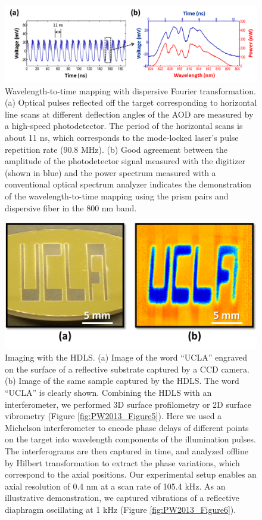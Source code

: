 \begin{figure}[htb!]
\centering
\includegraphics[scale=1]{PW2013/Figure3.png}
\caption{Wavelength-to-time mapping with dispersive Fourier transformation. (a) Optical pulses reflected off the target corresponding to horizontal line scans at different deflection angles of the AOD are measured by a high-speed photodetector. The period of the horizontal scans is about 11 ns, which corresponds to the mode-locked laser’s pulse repetition rate (90.8 MHz). (b) Good agreement between the amplitude of the photodetector signal measured with the digitizer (shown in blue) and the power spectrum measured with a conventional optical spectrum analyzer indicates the demonstration of the wavelength-to-time mapping using the prism pairs and dispersive fiber in the 800 nm band.}
\label{fig:PW2013_Figure3}
\end{figure}

\begin{figure}[htb!]
\centering
\includegraphics[scale=1]{PW2013/Figure4.png}
\caption{Imaging with the HDLS. (a) Image of the word “UCLA” engraved on the surface of a reflective substrate captured by a CCD camera. (b) Image of the same sample captured by the HDLS. The word “UCLA” is clearly shown. 
Combining the HDLS with an interferometer, we performed 3D surface profilometry or 2D surface vibrometry (Figure \ref{fig:PW2013_Figure5}). Here we used a Michelson interferometer to encode phase delays of different points on the target into wavelength components of the illumination pulses. The interferograms are then captured in time, and analyzed offline by Hilbert transformation to extract the phase variations, which correspond to the axial positions. Our experimental setup enables an axial resolution of 0.4 nm at a scan rate of 105.4 kHz. As an illustrative demonstration, we captured vibrations of a reflective diaphragm oscillating at 1 kHz (Figure \ref{fig:PW2013_Figure6}).}
\label{fig:PW2013_Figure4}
\end{figure}
 

